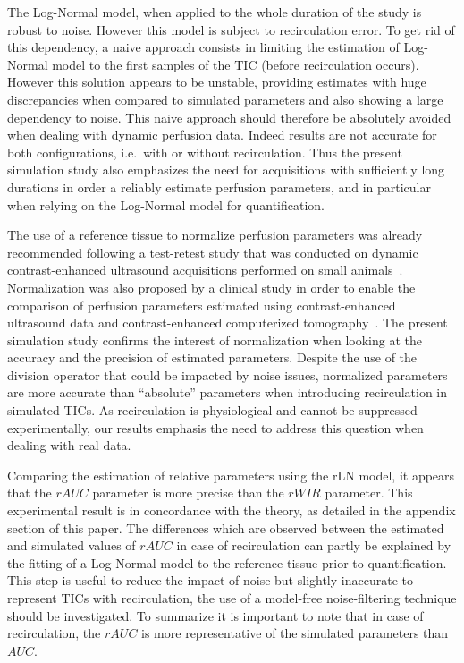 The Log-Normal model, when applied to the whole duration of the study is robust to noise. However this model is subject to recirculation error. To get rid of this dependency, a naive approach consists in limiting the estimation of Log-Normal model to the first samples of the TIC (before recirculation occurs). However this solution appears to be unstable, providing estimates with huge discrepancies when compared to simulated parameters and also showing a large dependency to noise. This naive approach should therefore be absolutely avoided when dealing with dynamic perfusion data. Indeed results are not accurate for both configurations, i.e.~with or without recirculation. Thus the present simulation study also emphasizes the need for acquisitions with sufficiently long durations in order a reliably estimate perfusion parameters, and in particular when relying on the Log-Normal model for quantification. 

The use of a reference tissue to normalize perfusion parameters was already recommended following a test-retest study that was conducted on dynamic contrast-enhanced ultrasound acquisitions performed on small animals~\cite{Doury:2017fz}. Normalization was also proposed by a clinical study in order to enable the comparison of perfusion parameters estimated using contrast-enhanced ultrasound data and contrast-enhanced computerized tomography~\cite{Lefort2012}. The present simulation study confirms the interest of normalization when looking at the accuracy and the precision of estimated parameters. Despite the use of the division operator that could be impacted by noise issues, normalized parameters are more accurate than ``absolute'' parameters when introducing recirculation in simulated TICs. As recirculation is physiological and cannot be suppressed experimentally, our results emphasis the need to address this question when dealing with real data.

Comparing the estimation of relative parameters using the rLN model, it appears that the $rAUC$ parameter is more precise than the $rWIR$ parameter. This experimental result is in concordance with the theory, as detailed in the appendix section of this paper. The differences which are observed between the estimated and simulated values of $rAUC$ in case of recirculation can partly be explained by the fitting of a Log-Normal model to the reference tissue prior to quantification. This step is useful to reduce the impact of noise but slightly inaccurate to represent TICs with recirculation, the use of a model-free noise-filtering technique should be investigated. To summarize it is important to note that in case of recirculation, the $rAUC$ is more representative of the simulated parameters than $AUC$.

